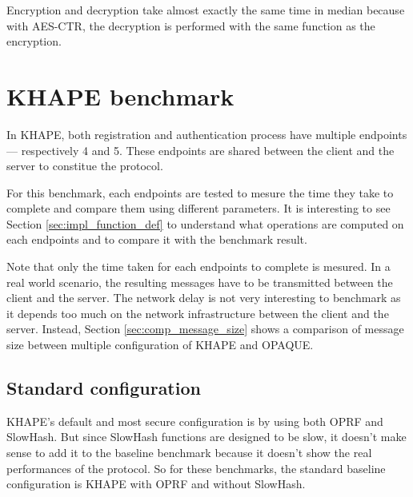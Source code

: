 \documentclass[../report.tex]{subfiles}
\begin{document}
Encryption and decryption take almost exactly the same time in median because with AES-CTR, the decryption is performed with the same function as the encryption.






\section{KHAPE benchmark} %

In KHAPE, both registration and authentication process have multiple endpoints --- respectively 4 and 5. These endpoints are shared between the client and the server to constitue the protocol.

For this benchmark, each endpoints are tested to mesure the time they take to complete and compare them using different parameters. 
It is interesting to see Section \ref{sec:impl_function_def} to understand what operations are computed on each endpoints and to compare it with the benchmark result.

Note that only the time taken for each endpoints to complete is mesured. In a real world scenario, the resulting messages have to be transmitted between the client and the server. The network delay is not very interesting to benchmark as it depends too much on the network infrastructure between the client and the server. Instead, Section \ref{sec:comp_message_size} shows a comparison of message size between multiple configuration of KHAPE and OPAQUE.

\subsection{Standard configuration}
KHAPE's default and most secure configuration is by using both OPRF and SlowHash. 
But since SlowHash functions are designed to be slow, it doesn't make sense to add it to the baseline benchmark because it doesn't show the real performances of the protocol.
So for these benchmarks, the standard baseline configuration is KHAPE with OPRF and without SlowHash.
\end{document}
